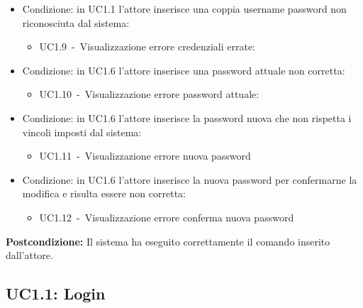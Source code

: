 \documentclass{scalatekids-article}
\begin{document}
\begin{itemize}
\item Condizione: in UC1.1 l'attore inserisce una coppia username password non riconosciuta dal sistema:
  \begin{itemize}
  \item UC1.9\ -\ Visualizzazione errore credenziali errate:
  \end{itemize}
\item Condizione: in UC1.6 l'attore inserisce una password attuale non corretta:
  \begin{itemize}
  \item UC1.10\ -\ Visualizzazione errore password attuale:
  \end{itemize}
\item Condizione: in UC1.6 l'attore inserisce la password nuova che non rispetta i vincoli imposti dal sistema: %
  \begin{itemize}
  \item UC1.11\ -\ Visualizzazione errore nuova password
  \end{itemize}
\item Condizione: in UC1.6 l'attore inserisce la nuova password per confermarne la modifica e risulta essere non corretta: %
  \begin{itemize}
  \item UC1.12\ -\ Visualizzazione errore conferma nuova password
  \end{itemize}
\end{itemize}
\textbf{Postcondizione:} Il sistema ha eseguito correttamente il comando inserito dall'attore.


\subsection{UC1.1: Login}
\end{document}
